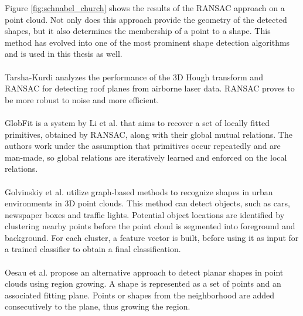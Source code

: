 Figure \ref{fig:schnabel_church} shows the results of the RANSAC approach on a point cloud. Not only does this approach provide the geometry of the detected shapes, but it also determines the membership of a point to a shape. This method has evolved into one of the most prominent shape detection algorithms and is used in this thesis as well. 
\\
\\
Tarsha-Kurdi \cite{tarsha2007hough} analyzes the performance of the 3D Hough transform and RANSAC for detecting roof planes from airborne laser data. RANSAC proves to be more robust to noise and more efficient.
\\
\\
GlobFit is a system by Li et al. \cite{li2011globfit} that aims to recover a set of locally fitted primitives, obtained by RANSAC, along with their global mutual relations. The authors work under the assumption that primitives occur repeatedly and are man-made, so global relations are iteratively learned and enforced on the local relations. 
\\
\\
Golvinskiy et al. \cite{golovinskiy2009shape} utilize graph-based methods to recognize shapes in urban environments in 3D point clouds. This method can detect objects, such as cars, newspaper boxes and traffic lights. Potential object locations are identified by clustering nearby points before the point cloud is segmented into foreground and background. For each cluster, a feature vector is built, before using it as input for a trained classifier to obtain a final classification. 
\\
\\
Oesau et al. \cite{oesau2016planar} propose an alternative approach to detect planar shapes in point clouds using region growing. A shape is represented as a set of points and an associated fitting plane. Points or shapes from the neighborhood are added consecutively to the plane, thus growing the region. 